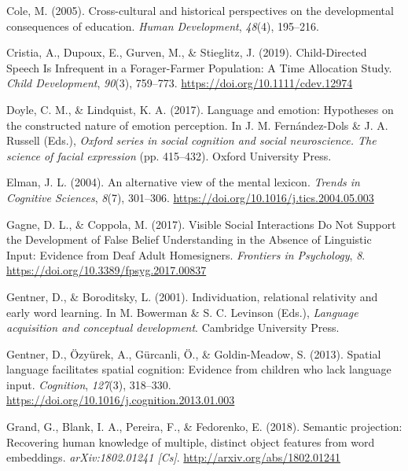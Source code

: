 \documentclass[11pt,man]{article}
\newlength{\cslhangindent}
\newenvironment{cslreferences}%
  {\setlength{\parindent}{0pt}%
  \everypar{\setlength{\hangindent}{\cslhangindent}}\ignorespaces}%
  {\par}
\begin{document}
\begin{cslreferences}
\leavevmode\hypertarget{ref-cole_cross-cultural_2005}{}%
Cole, M. (2005). Cross-cultural and historical perspectives on the
developmental consequences of education. \emph{Human Development},
\emph{48}(4), 195--216.

\leavevmode\hypertarget{ref-cristia_child-directed_2019}{}%
Cristia, A., Dupoux, E., Gurven, M., \& Stieglitz, J. (2019).
Child-Directed Speech Is Infrequent in a Forager-Farmer Population: A
Time Allocation Study. \emph{Child Development}, \emph{90}(3), 759--773.
\url{https://doi.org/10.1111/cdev.12974}

\leavevmode\hypertarget{ref-doyle_language_2017}{}%
Doyle, C. M., \& Lindquist, K. A. (2017). Language and emotion:
Hypotheses on the constructed nature of emotion perception. In J. M.
Fernández-Dols \& J. A. Russell (Eds.), \emph{Oxford series in social
cognition and social neuroscience. The science of facial expression}
(pp. 415--432). Oxford University Press.

\leavevmode\hypertarget{ref-elman_alternative_2004}{}%
Elman, J. L. (2004). An alternative view of the mental lexicon.
\emph{Trends in Cognitive Sciences}, \emph{8}(7), 301--306.
\url{https://doi.org/10.1016/j.tics.2004.05.003}

\leavevmode\hypertarget{ref-gagne_visible_2017}{}%
Gagne, D. L., \& Coppola, M. (2017). Visible Social Interactions Do Not
Support the Development of False Belief Understanding in the Absence of
Linguistic Input: Evidence from Deaf Adult Homesigners. \emph{Frontiers
in Psychology}, \emph{8}. \url{https://doi.org/10.3389/fpsyg.2017.00837}

\leavevmode\hypertarget{ref-gentner_individuation_2001}{}%
Gentner, D., \& Boroditsky, L. (2001). Individuation, relational
relativity and early word learning. In M. Bowerman \& S. C. Levinson
(Eds.), \emph{Language acquisition and conceptual development}.
Cambridge University Press.

\leavevmode\hypertarget{ref-gentner_spatial_2013-1}{}%
Gentner, D., Özyürek, A., Gürcanli, Ö., \& Goldin-Meadow, S. (2013).
Spatial language facilitates spatial cognition: Evidence from children
who lack language input. \emph{Cognition}, \emph{127}(3), 318--330.
\url{https://doi.org/10.1016/j.cognition.2013.01.003}

\leavevmode\hypertarget{ref-grand_semantic_2018}{}%
Grand, G., Blank, I. A., Pereira, F., \& Fedorenko, E. (2018). Semantic
projection: Recovering human knowledge of multiple, distinct object
features from word embeddings. \emph{arXiv:1802.01241 {[}Cs{]}}.
\url{http://arxiv.org/abs/1802.01241}


\end{cslreferences}
\end{document}
